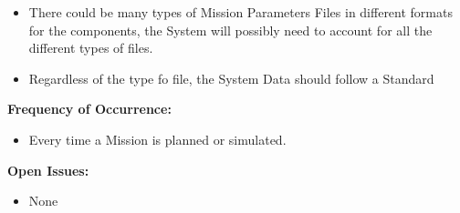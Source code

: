 \documentclass[letterpaper]{article}
\begin{document}
\begin{itemize}
   \item There could be many types of Mission Parameters Files in 
      different formats for the components, the System will possibly 
      need to account for all the different types of files.
   \item Regardless of the type fo file, the System Data should 
      follow a Standard
\end{itemize}
\textbf{Frequency of Occurrence:}
\begin{itemize}
   \item Every time a Mission is planned or simulated.
\end{itemize}
\textbf{Open Issues:}
\begin{itemize}
   \item None
\end{itemize}
\end{document}
